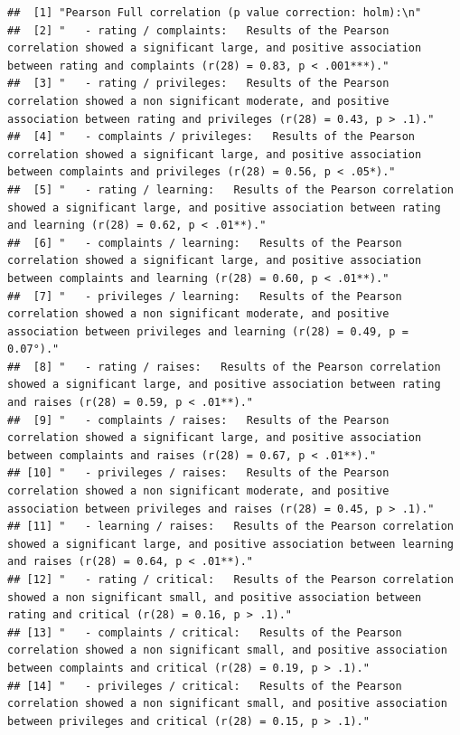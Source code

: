 \documentclass[]{book}
\theoremstyle{definition}
\theoremstyle{definition}
\theoremstyle{definition}
\theoremstyle{remark}
\begin{document}
\begin{verbatim}
##  [1] "Pearson Full correlation (p value correction: holm):\n"                                                                                                                                 
##  [2] "   - rating / complaints:   Results of the Pearson correlation showed a significant large, and positive association between rating and complaints (r(28) = 0.83, p < .001***)."         
##  [3] "   - rating / privileges:   Results of the Pearson correlation showed a non significant moderate, and positive association between rating and privileges (r(28) = 0.43, p > .1)."       
##  [4] "   - complaints / privileges:   Results of the Pearson correlation showed a significant large, and positive association between complaints and privileges (r(28) = 0.56, p < .05*)."    
##  [5] "   - rating / learning:   Results of the Pearson correlation showed a significant large, and positive association between rating and learning (r(28) = 0.62, p < .01**)."               
##  [6] "   - complaints / learning:   Results of the Pearson correlation showed a significant large, and positive association between complaints and learning (r(28) = 0.60, p < .01**)."       
##  [7] "   - privileges / learning:   Results of the Pearson correlation showed a non significant moderate, and positive association between privileges and learning (r(28) = 0.49, p = 0.07°)."
##  [8] "   - rating / raises:   Results of the Pearson correlation showed a significant large, and positive association between rating and raises (r(28) = 0.59, p < .01**)."                   
##  [9] "   - complaints / raises:   Results of the Pearson correlation showed a significant large, and positive association between complaints and raises (r(28) = 0.67, p < .01**)."           
## [10] "   - privileges / raises:   Results of the Pearson correlation showed a non significant moderate, and positive association between privileges and raises (r(28) = 0.45, p > .1)."       
## [11] "   - learning / raises:   Results of the Pearson correlation showed a significant large, and positive association between learning and raises (r(28) = 0.64, p < .01**)."               
## [12] "   - rating / critical:   Results of the Pearson correlation showed a non significant small, and positive association between rating and critical (r(28) = 0.16, p > .1)."              
## [13] "   - complaints / critical:   Results of the Pearson correlation showed a non significant small, and positive association between complaints and critical (r(28) = 0.19, p > .1)."      
## [14] "   - privileges / critical:   Results of the Pearson correlation showed a non significant small, and positive association between privileges and critical (r(28) = 0.15, p > .1)."      

\end{verbatim}
\end{document}
